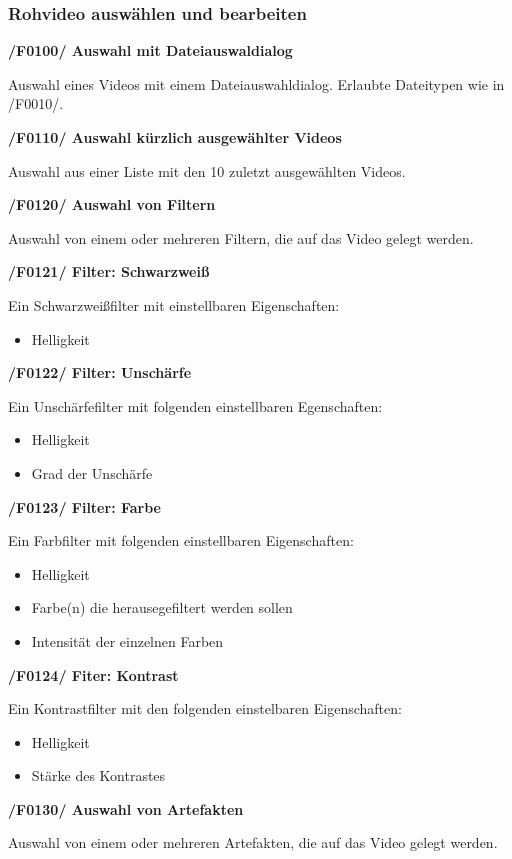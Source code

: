 \documentclass[parskip=full]{scrartcl}
\begin{document}
\subsubsection{Rohvideo auswählen und bearbeiten}
\textbf{/F0100/ Auswahl mit Dateiauswaldialog}

Auswahl eines Videos mit einem Dateiauswahldialog. Erlaubte Dateitypen wie in /F0010/.

\textbf{/F0110/ Auswahl kürzlich ausgewählter Videos}

Auswahl aus einer Liste mit den 10 zuletzt ausgewählten Videos.

\textbf{/F0120/ Auswahl von Filtern}

Auswahl von einem oder mehreren Filtern, die auf das Video gelegt werden.

\textbf{/F0121/ Filter: Schwarzweiß}

Ein Schwarzweißfilter mit einstellbaren Eigenschaften:
\begin{itemize}
\item Helligkeit
\end{itemize}
\newpage
\textbf{/F0122/ Filter: Unschärfe}

Ein Unschärfefilter mit folgenden einstellbaren Egenschaften:
\begin{itemize}
\item Helligkeit
\item Grad der Unschärfe
\end{itemize}

\textbf{/F0123/ Filter: Farbe}

Ein Farbfilter mit folgenden einstellbaren Eigenschaften:
\begin{itemize}
\item Helligkeit
\item Farbe(n) die herausegefiltert werden sollen
\item Intensität der einzelnen Farben
\end{itemize}

\textbf{/F0124/ Fiter: Kontrast}

Ein Kontrastfilter mit den folgenden einstelbaren Eigenschaften:
\begin{itemize}
\item Helligkeit
\item Stärke des Kontrastes
\end{itemize}

\textbf{/F0130/ Auswahl von Artefakten}

Auswahl von einem oder mehreren Artefakten, die auf das Video gelegt werden.
\end{document}
